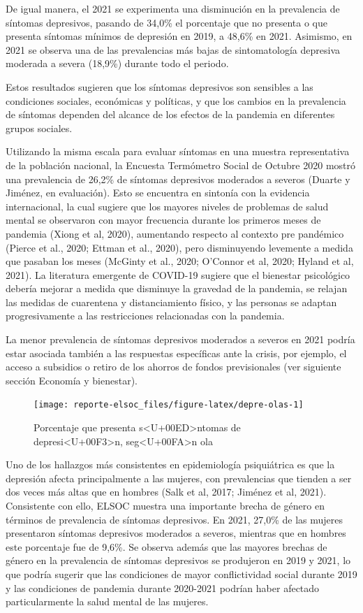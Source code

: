 \documentclass[
  12pt,
]{book}
\begin{document}
De igual manera, el 2021 se experimenta una disminución en la prevalencia de síntomas depresivos, pasando de 34,0\% el porcentaje que no presenta o que presenta síntomas mínimos de depresión en 2019, a 48,6\% en 2021. Asimismo, en 2021 se observa una de las prevalencias más bajas de sintomatología depresiva moderada a severa (18,9\%) durante todo el periodo.

Estos resultados sugieren que los síntomas depresivos son sensibles a las condiciones sociales, económicas y políticas, y que los cambios en la prevalencia de síntomas dependen del alcance de los efectos de la pandemia en diferentes grupos sociales.

Utilizando la misma escala para evaluar síntomas en una muestra representativa de la población nacional, la Encuesta Termómetro Social de Octubre 2020 mostró una prevalencia de 26,2\% de síntomas depresivos moderados a severos (Duarte y Jiménez, en evaluación). Esto se encuentra en sintonía con la evidencia internacional, la cual sugiere que los mayores niveles de problemas de salud mental se observaron con mayor frecuencia durante los primeros meses de pandemia (Xiong et al, 2020), aumentando respecto al contexto pre pandémico (Pierce et al., 2020; Ettman et al., 2020), pero disminuyendo levemente a medida que pasaban los meses (McGinty et al., 2020; O'Connor et al, 2020; Hyland et al, 2021). La literatura emergente de COVID-19 sugiere que el bienestar psicológico debería mejorar a medida que disminuye la gravedad de la pandemia, se relajan las medidas de cuarentena y distanciamiento físico, y las personas se adaptan progresivamente a las restricciones relacionadas con la pandemia.

La menor prevalencia de síntomas depresivos moderados a severos en 2021 podría estar asociada también a las respuestas específicas ante la crisis, por ejemplo, el acceso a subsidios o retiro de los ahorros de fondos previsionales (ver siguiente sección Economía y bienestar).

\begin{figure}

{\centering \texttt{[image: reporte-elsoc\_files/figure-latex/depre-olas-1]} 

}

\caption{Porcentaje que presenta s<U+00ED>ntomas de depresi<U+00F3>n, seg<U+00FA>n ola}\label{fig:depre-olas}
\end{figure}

Uno de los hallazgos más consistentes en epidemiología psiquiátrica es que la depresión afecta principalmente a las mujeres, con prevalencias que tienden a ser dos veces más altas que en hombres (Salk et al, 2017; Jiménez et al, 2021). Consistente con ello, ELSOC muestra una importante brecha de género en términos de prevalencia de síntomas depresivos. En 2021, 27,0\% de las mujeres presentaron síntomas depresivos moderados a severos, mientras que en hombres este porcentaje fue de 9,6\%. Se observa además que las mayores brechas de género en la prevalencia de síntomas depresivos se produjeron en 2019 y 2021, lo que podría sugerir que las condiciones de mayor conflictividad social durante 2019 y las condiciones de pandemia durante 2020-2021 podrían haber afectado particularmente la salud mental de las mujeres.
\end{document}
